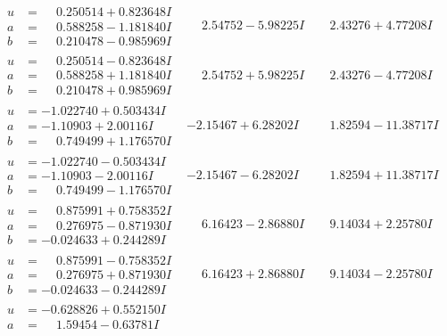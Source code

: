 \documentclass[1p]{elsarticle_modified}
\theoremstyle{definition}
\begin{document}
$$\begin{array}{c|c|c}
\begin{aligned}
u &= \phantom{-}0.250514 + 0.823648 I \\
a &= \phantom{-}0.588258 - 1.181840 I \\
b &= \phantom{-}0.210478 - 0.985969 I\end{aligned}
 & \phantom{-}2.54752 - 5.98225 I & \phantom{-}2.43276 + 4.77208 I \\ \hline\begin{aligned}
u &= \phantom{-}0.250514 - 0.823648 I \\
a &= \phantom{-}0.588258 + 1.181840 I \\
b &= \phantom{-}0.210478 + 0.985969 I\end{aligned}
 & \phantom{-}2.54752 + 5.98225 I & \phantom{-}2.43276 - 4.77208 I \\ \hline\begin{aligned}
u &= -1.022740 + 0.503434 I \\
a &= -1.10903 + 2.00116 I \\
b &= \phantom{-}0.749499 + 1.176570 I\end{aligned}
 & -2.15467 + 6.28202 I & \phantom{-}1.82594 - 11.38717 I \\ \hline\begin{aligned}
u &= -1.022740 - 0.503434 I \\
a &= -1.10903 - 2.00116 I \\
b &= \phantom{-}0.749499 - 1.176570 I\end{aligned}
 & -2.15467 - 6.28202 I & \phantom{-}1.82594 + 11.38717 I \\ \hline\begin{aligned}
u &= \phantom{-}0.875991 + 0.758352 I \\
a &= \phantom{-}0.276975 - 0.871930 I \\
b &= -0.024633 + 0.244289 I\end{aligned}
 & \phantom{-}6.16423 - 2.86880 I & \phantom{-}9.14034 + 2.25780 I \\ \hline\begin{aligned}
u &= \phantom{-}0.875991 - 0.758352 I \\
a &= \phantom{-}0.276975 + 0.871930 I \\
b &= -0.024633 - 0.244289 I\end{aligned}
 & \phantom{-}6.16423 + 2.86880 I & \phantom{-}9.14034 - 2.25780 I \\ \hline\begin{aligned}
u &= -0.628826 + 0.552150 I \\
a &= \phantom{-}1.59454 - 0.63781 I \\

\end{aligned}
\end{array}$$
\end{document}
